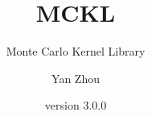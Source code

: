 \title{MCKL}
\subtitle{Monte Carlo Kernel Library}
\author{Yan Zhou}
\date{version 3.0.0}

\maketitle
\tableofcontents
\listoftables
